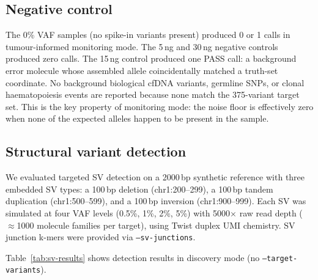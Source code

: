 \subsection{Negative control}

The 0\% VAF samples (no spike-in variants present) produced 0 or 1 calls in
tumour-informed monitoring mode.
The 5\,ng and 30\,ng negative controls produced zero calls.
The 15\,ng control produced one PASS call: a background error molecule whose
assembled allele coincidentally matched a truth-set coordinate.
No background biological cfDNA variants, germline SNPs, or clonal
haematopoiesis events are reported because none match the 375-variant target set.
This is the key property of monitoring mode: the noise floor is effectively zero
when none of the expected alleles happen to be present in the sample.

\subsection{Structural variant detection}
\label{sec:sv-results}

We evaluated targeted SV detection on a 2000\,bp synthetic reference with three embedded SV types: a 100\,bp deletion (chr1:200--299), a 100\,bp tandem duplication (chr1:500--599), and a 100\,bp inversion (chr1:900--999). Each SV was simulated at four VAF levels (0.5\%, 1\%, 2\%, 5\%) with 5000$\times$ raw read depth ($\approx$1000 molecule families per target), using Twist duplex UMI chemistry. SV junction k-mers were provided via \texttt{--sv-junctions}.

Table~\ref{tab:sv-results} shows detection results in discovery mode (no \texttt{--target-variants}).


